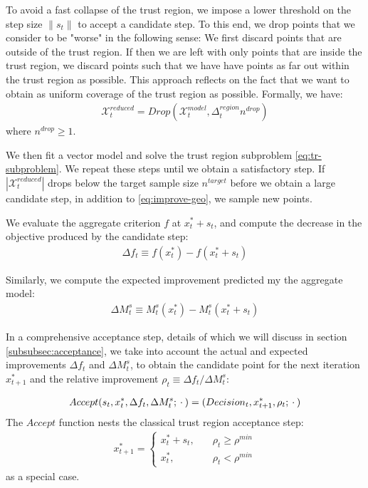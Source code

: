 To avoid a fast collapse of the trust region, we impose a lower threshold on the step size $\lVert s_t\rVert$ to accept a candidate step. To this end, we drop points that we consider to be "worse" in the following sense: We first discard points that are outside of the trust region. If then we are left with only points that are inside the trust region, we discard points such that we have have points as far out within the trust region as possible. This approach reflects on the fact that we want to obtain as uniform coverage of the trust region as possible. Formally, we have:
\begin{align}
    \mathcal{X}_t^{reduced} = Drop(\mathcal{X}_t^{model},\Delta_t^{region} n^{drop})
    \label{eq:improve-geo}
\end{align}
where $n^{drop}\geq1$.

We then fit a vector model and solve the trust region subproblem \ref{eq:tr-subproblem}. We repeat these steps until we obtain a satisfactory step. If $|\mathcal{X}_t^{reduced}|$ drops below the target sample size $n^{target}$ before we obtain a large candidate step, in addition to \ref{eq:improve-geo}, we sample new points.


We evaluate the aggregate criterion $f$ at $x^{*}_t+s_t$, and compute the decrease in the objective produced by the candidate step:
\begin{align}
    \Delta f_t\equiv f(x_t^*) - f(x_t^*+s_t)
    \label{eq:actual-improvement}
\end{align}

Similarly, we compute the expected improvement predicted my the aggregate model:
\begin{align}
    \Delta M^{s}_t\equiv M_t^s(x_t^*) - M_t^s(x_t^*+s_t)
    \label{eq:expected-improvement}
\end{align}

In a comprehensive acceptance step, details of which we will discuss in section \ref{subsubsec:acceptance}, we take into account the actual and expected improvements $\Delta f_t$ and $\Delta M_t^s$, to obtain the candidate point for the next iteration $x_{t+1}^*$ and the relative improvement $\rho_t\equiv \Delta f_t/ \Delta M^s_t$:

\begin{align}
    Accept(s_t,x_t^{*},\Delta f_t,\Delta M_t^s;\hspace{0.2em}\cdot\hspace{0.2em})=(Decision_t,x_{t+1}^{*},\rho_t;\hspace{0.2em}\cdot\hspace{0.2em})
    \label{eq:acceptance-core}
\end{align}
The $Accept$ function nests the classical trust region acceptance step:
\begin{align}
    x_{t+1}^*=\begin{cases}
        x_t^*+s_t,\quad&\rho_t\geq\rho^{min}\\
        x_t^*,\quad&\rho_t<\rho^{min}
    \end{cases}
    \label{eq:accept-classic}
\end{align}
as a special case.

